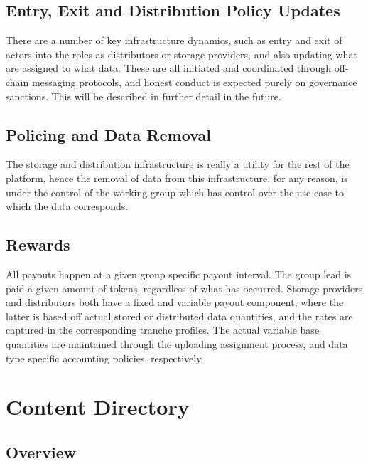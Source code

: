 \documentclass{article}
\begin{document}
\subsection{Entry, Exit and Distribution Policy Updates}

There are a number of key infrastructure dynamics, such as entry and exit of actors into the roles as distributors or storage providers, and also updating what are assigned to what data. These are all initiated and coordinated through off-chain messaging protocols, and honest conduct is expected purely on governance sanctions. This will be described in further detail in the future.

\subsection{Policing and Data Removal}

The storage and distribution infrastructure is really a utility for the rest of the platform, hence the removal of data from this infrastructure, for any reason, is under the control of the working group which has control over the use case to which the data corresponds.

\subsection{Rewards}

All payouts happen at a given group specific payout interval.
The group lead is paid a given amount of tokens, regardless of what has occurred. Storage providers and distributors both have a fixed and variable payout component, where the latter is based off actual stored or distributed data quantities, and the rates are captured in the corresponding tranche profiles. The actual variable base quantities are maintained through the uploading assignment process, and data type specific accounting policies, respectively.


\section{Content Directory} \label{sec:content_directory}

\subsection{Overview}
\end{document}
